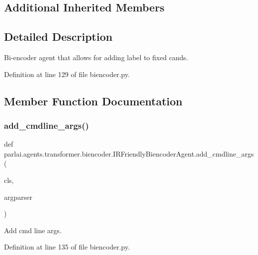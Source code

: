 \subsection*{Additional Inherited Members}


\subsection{Detailed Description}
\begin{DoxyVerb}Bi-encoder agent that allows for adding label to fixed cands.
\end{DoxyVerb}
 

Definition at line 129 of file biencoder.\+py.



\subsection{Member Function Documentation}
\mbox{\label{classparlai_1_1agents_1_1transformer_1_1biencoder_1_1IRFriendlyBiencoderAgent_a8ad3444ddd1002990ce5472fa1ec72bf}} 
\subsubsection{\texorpdfstring{add\+\_\+cmdline\+\_\+args()}{add\_cmdline\_args()}}
{\footnotesize\ttfamily def parlai.\+agents.\+transformer.\+biencoder.\+I\+R\+Friendly\+Biencoder\+Agent.\+add\+\_\+cmdline\+\_\+args (\begin{DoxyParamCaption}\item[{}]{cls,  }\item[{}]{argparser }\end{DoxyParamCaption})}

\begin{DoxyVerb}Add cmd line args.
\end{DoxyVerb}
 

Definition at line 135 of file biencoder.\+py.


